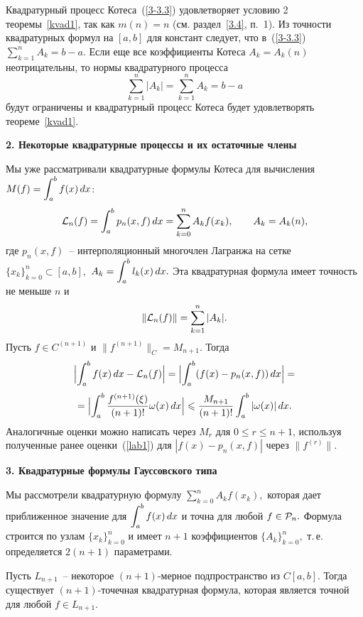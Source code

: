 \begin{Remark}
{Квадратурный процесс Котеса~(\ref{3-3.3}) удовлетворяет условию 2
теоремы~\ref{kvad1},} {так как
$m(n)=n$ (см. раздел~\ref{3.4}, п.~1). Из точности} квадратурных формул на
$[a,b]$ {для констант следует, что в~(\ref{3-3.3})}
$\sum\limits_{k=1}^n A_k=b-a.$ Если еще
все коэффициенты Котеса $A_k=A_k(n)$ неотрицательны, то нормы квадратурного процесса
\[
  \sum\limits_{k=1}^n |A_k|=
  \sum\limits_{k=1}^n A_k=b-a
\]
будут ограничены {и квадратурный процесс Котеса будет удовлетворять
теореме~\ref{kvad1}.}
\end{Remark}

\vspace{5mm}
{\bf 2. Некоторые квадратурные процессы и их остаточные члены}
\vspace{5mm}

Мы уже рассматривали квадратурные формулы Котеса для вычисления
$M(f)=\ds\int_a^b f(x)\,dx$:
\[
  \Cal L_n (f)=\int_a^b p_n(x,f)\,dx=
  \sum\limits_{k=0}^n A_k f(x_k),\qquad A_k=A_k(n),
\]
где {$p_n(x,f)$~-- интерполяционный многочлен Лагранжа на сетке
$\{x_k\}_{k=0}^n\subset[a,b],$}  $A_k=\ds\int_a^b l_k(x)\,dx.$ Эта квадратурная
формула имеет точность {не меньше} $n$ и
\[
  \|\Cal L_n(f)\|=\sum\limits_{k=1}^n |A_k|.
\]
Пусть $f \in C^{(n+1)}$
{и $\|f^{(n+1)}\|_C=M_{n+1}$}.
Тогда
$$
  \Bigl|  \int_a^b f(x)\,dx - \Cal L_n(f) \Bigr|=
  \Bigl|  \int_a^b (f(x) - p_n(x,f))\,dx \Bigr|=
$$
$$
  =\Bigl|  \int_a^b \frac{f^{(n+1)}(\xi )}{(n+1)!}\omega (x)\,dx \Bigr| \le
  \frac{M_{n+1}}{(n+1)!}   \int_a^b |\omega (x)|\, dx.
$$
Аналогичные оценки можно написать через
$M_r$ для $0 \le r \le n+1$,
используя полученные ранее оценки~(\ref{lab1}) для $|f(x)-p_n(x,f)|$
через $\| f^{(r)}\|.$

\vspace{3mm}
{\bf 3. Квадратурные формулы Гауссовского типа}
\vspace{3mm}

Мы рассмотрели квадратурную формулу $\sum\limits_{k=0}^n A_k f(x_k),$ которая дает
приближенное значение для $\ds\int_a^b f(x)\,dx$ и точна для любой $f \in \Cal P_n.$
Формула строится по узлам $\{x_k\}_{k=0}^n$ и имеет $n+1$ коэффициентов
$\{A_k\}_{k=0}^n,$ т.\,е. определяется $2(n+1)$ параметрами.

\begin{teo}
Пусть
$L_{n+1}$~-- некоторое {$(n+1)$-мерное} подпространство из
$C[a,b].$ Тогда существует
{$(n+1)$-точечная}
квадратурная формула, которая является
точной для любой $f \in L_{n+1}.$
\end{teo}

